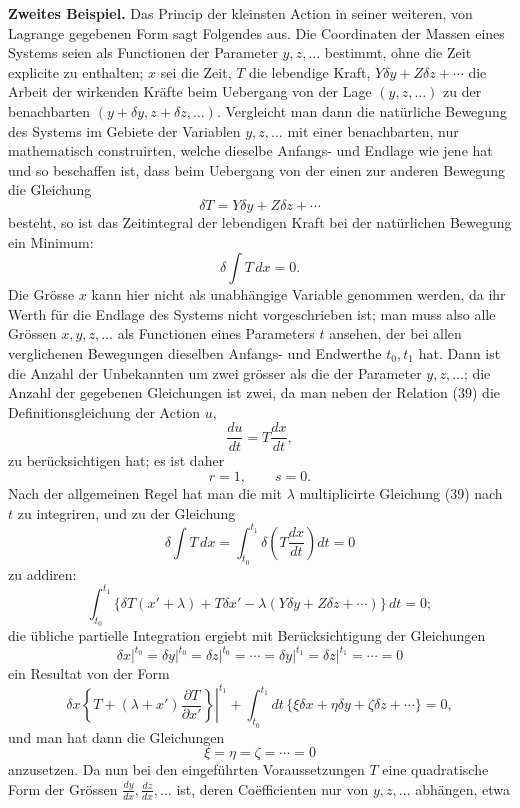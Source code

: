 \documentclass[11pt,a4paper,leqno]{article}
\begin{document}
\noindent\textbf{Zweites Beispiel.} Das Princip der kleinsten Action in seiner weiteren, von Lagrange gegebenen Form sagt Folgendes aus. Die Coordinaten der Massen eines Systems seien als Functionen der Parameter $y,z,\ldots$ bestimmt, ohne die Zeit explicite zu enthalten; $x$ sei die Zeit, $T$ die lebendige Kraft, $Y\delta y+Z\delta z+\cdots$ die Arbeit der wirkenden Kräfte beim Uebergang von der Lage $(y,z,\ldots)$ zu der benachbarten $(y+\delta y,z+\delta z,\ldots)$. Vergleicht man dann die natürliche Bewegung des Systems im Gebiete der Variablen $y,z,\ldots$ mit einer benachbarten, nur mathematisch construirten, welche dieselbe Anfangs- und Endlage wie jene
hat und so beschaffen ist, dass beim Uebergang von der einen zur anderen Bewegung die Gleichung
\begin{equation}\tag{39}
\delta T=Y\delta y+Z\delta z+\cdots
\end{equation}
besteht, so ist das Zeitintegral der lebendigen Kraft bei der natürlichen Bewegung ein Minimum:
\[
\delta\int T\,dx=0.
\]
Die Grösse $x$ kann hier nicht als unabhängige Variable genommen werden, da ihr Werth für die Endlage des Systems nicht vorgeschrieben ist; man muss also alle Grössen $x,y,z,\ldots$ als Functionen eines Parameters $t$ ansehen, der bei allen verglichenen Bewegungen dieselben Anfangs- und Endwerthe $t_0,t_1$ hat. Dann ist die Anzahl der Unbekannten um zwei grösser als die der Parameter $y,z,\ldots$; die Anzahl der gegebenen Gleichungen ist zwei, da man neben der Relation (39) die Definitionsgleichung der Action $u$,
\[
\frac{du}{dt}=T\frac{dx}{dt},
\]
zu berücksichtigen hat; es ist daher
\[
r=1,\qquad s=0.
\]
Nach der allgemeinen Regel hat man die mit $\lambda$ multiplicirte Gleichung (39) nach $t$ zu integriren, und zu der Gleichung
\[
\delta\int T\,dx=\int_{t_0}^{t_1}\delta\left(T\frac{dx}{dt}\right)dt=0
\]
zu addiren:
\[
\int_{t_0}^{t_1}\{\delta T(x'+\lambda)+T\delta x'
-\lambda(Y\delta y+Z\delta z+\cdots)\}\,dt=0;
\]
die übliche partielle Integration ergiebt mit Berücksichtigung der Gleichungen
\[
\left.\delta x\right|^{t_0}=\left.\delta y\right|^{t_0}
=\left.\delta z\right|^{t_0}=\cdots
=\left.\delta y\right|^{t_1}=\left.\delta z\right|^{t_1}=\cdots=0
\]
ein Resultat von der Form
\[
\left.\delta x\left\{T+(\lambda+x')\frac{\partial T}{\partial x'}\right\}\right|^{t_1}
+\int_{t_0}^{t_1}dt\,\{\xi\delta x+\eta\delta y+\zeta\delta z+\cdots\}=0,
\]
und man hat dann die Gleichungen
\[
\xi=\eta=\zeta=\cdots=0
\]
anzusetzen. Da nun bei den eingeführten Voraussetzungen $T$ eine quadratische Form der Grössen $\frac{dy}{dx},\frac{dz}{dx},\ldots$ ist, deren Coëfficienten nur von $y,z,\ldots$ abhängen, etwa
\end{document}
